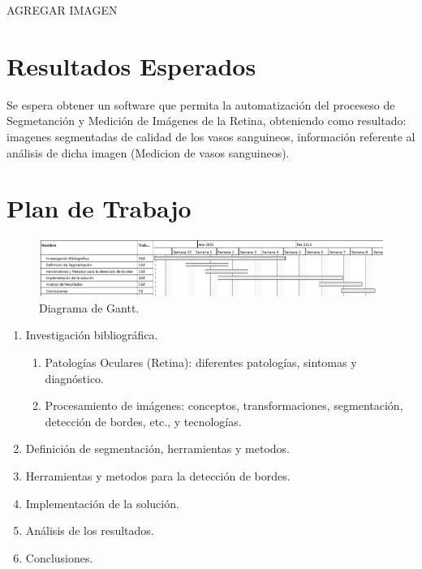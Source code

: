 \documentclass[14pt]{article}
\begin{document}
AGREGAR IMAGEN






\section{Resultados Esperados}

Se espera obtener un software que permita la automatización del proceseso de Segmetanción y Medición de Imágenes de la Retina, obteniendo como resultado: imagenes segmentadas de calidad de los vasos sanguineos, información referente al análisis de dicha imagen (Medicion de vasos sanguineos).


\section{Plan de Trabajo}


\begin{figure}[h]
	\begin{center}
		\includegraphics[scale=.5]{./Imagenes/Gantt.jpg}
		\caption{Diagrama de Gantt.}
	\end{center}
\end{figure} 



\begin{enumerate}
	\item Investigación bibliográfica.
		\begin{enumerate}
			\item Patologías Oculares (Retina): diferentes patologías, sintomas y diagnóstico.
			\item Procesamiento de imágenes: conceptos, transformaciones, segmentación, detección de bordes, etc., y tecnologías.
		\end{enumerate}
	\item Definición de segmentación, herramientas y metodos.
	\item Herramientas y metodos para la detección de bordes.
	\item Implementación de la solución.
    \item Análisis de los resultados.
	\item Conclusiones.
\end{enumerate}
\end{document}
